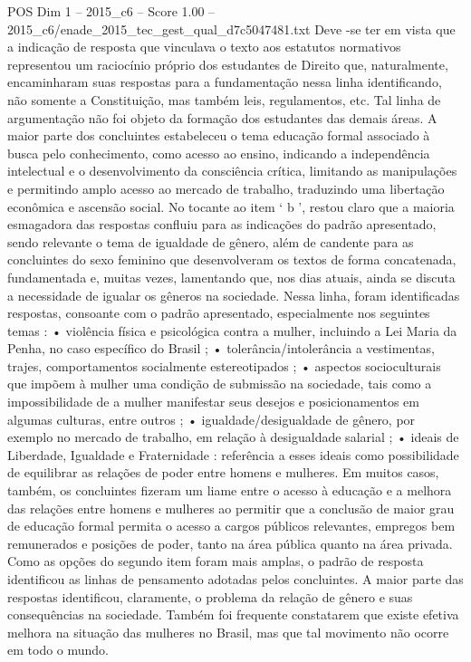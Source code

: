 \begin{textsample}{POS Dim 1 – 2015\_c6 – Score 1.00 – 2015\_c6/enade\_2015\_tec\_gest\_qual\_d7c5047481.txt}
Deve -se ter em vista que a indicação de resposta que vinculava o texto aos estatutos normativos representou um raciocínio próprio dos estudantes de Direito que, naturalmente, encaminharam suas respostas para a fundamentação nessa linha identificando, não somente a Constituição, mas também leis, regulamentos, etc.
Tal linha de argumentação não foi objeto da formação dos estudantes das demais áreas.
A maior parte dos concluintes estabeleceu o tema educação formal associado à busca pelo conhecimento, como acesso ao ensino, indicando a independência intelectual e o desenvolvimento da consciência crítica, limitando as manipulações e permitindo amplo acesso ao mercado de trabalho, traduzindo uma libertação econômica e ascensão social.
No tocante ao item ‘ b ’, restou claro que a maioria esmagadora das respostas confluiu para as indicações do padrão apresentado, sendo relevante o tema de igualdade de gênero, além de candente para as concluintes do sexo feminino que desenvolveram os textos de forma concatenada, fundamentada e, muitas vezes, lamentando que, nos dias atuais, ainda se discuta a necessidade de igualar os gêneros na sociedade.
Nessa linha, foram identificadas respostas, consoante com o padrão apresentado, especialmente nos seguintes temas : • violência física e psicológica contra a mulher, incluindo a Lei Maria da Penha, no caso específico do Brasil ; • tolerância/intolerância a vestimentas, trajes, comportamentos socialmente estereotipados ; • aspectos socioculturais que impõem à mulher uma condição de submissão na sociedade, tais como a impossibilidade de a mulher manifestar seus desejos e posicionamentos em algumas culturas, entre outros ; • igualdade/desigualdade de gênero, por exemplo no mercado de trabalho, em relação à desigualdade salarial ; • ideais de Liberdade, Igualdade e Fraternidade : referência a esses ideais como possibilidade de equilibrar as relações de poder entre homens e mulheres.
Em muitos casos, também, os concluintes fizeram um liame entre o acesso à educação e a melhora das relações entre homens e mulheres ao permitir que a conclusão de maior grau de educação formal permita o acesso a cargos públicos relevantes, empregos bem remunerados e posições de poder, tanto na área pública quanto na área privada.
Como as opções do segundo item foram mais amplas, o padrão de resposta identificou as linhas de pensamento adotadas pelos concluintes.
A maior parte das respostas identificou, claramente, o problema da relação de gênero e suas consequências na sociedade.
Também foi frequente constatarem que existe efetiva melhora na situação das mulheres no Brasil, mas que tal movimento não ocorre em todo o mundo.

\end{textsample}
